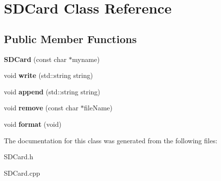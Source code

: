 \hypertarget{class_s_d_card}{
\section{SDCard Class Reference}
\label{class_s_d_card}
}
\subsection*{Public Member Functions}
\begin{DoxyCompactItemize}
\item 
\hypertarget{class_s_d_card_a7acced947ab82936d272d4d31119aa08}{
{\bfseries SDCard} (const char $\ast$myname)}
\label{class_s_d_card_a7acced947ab82936d272d4d31119aa08}

\item 
\hypertarget{class_s_d_card_a2cd7036bd514f10d0ec6262825ccb980}{
void {\bfseries write} (std::string string)}
\label{class_s_d_card_a2cd7036bd514f10d0ec6262825ccb980}

\item 
\hypertarget{class_s_d_card_a5d99231deaa7ef73644779f0ff51e0ad}{
void {\bfseries append} (std::string string)}
\label{class_s_d_card_a5d99231deaa7ef73644779f0ff51e0ad}

\item 
\hypertarget{class_s_d_card_a05903c05027364bddcf0e88f8b931b72}{
void {\bfseries remove} (const char $\ast$fileName)}
\label{class_s_d_card_a05903c05027364bddcf0e88f8b931b72}

\item 
\hypertarget{class_s_d_card_a4395462dbcc57c976199b1ebe2115ae7}{
void {\bfseries format} (void)}
\label{class_s_d_card_a4395462dbcc57c976199b1ebe2115ae7}

\end{DoxyCompactItemize}


The documentation for this class was generated from the following files:\begin{DoxyCompactItemize}
\item 
SDCard.h\item 
SDCard.cpp\end{DoxyCompactItemize}
